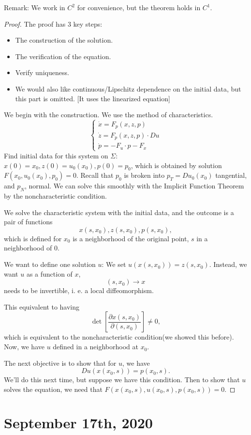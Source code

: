 \documentclass[11pt]{scrartcl}
\begin{document}
Remark: We work in $C^2$ for convenience, but the theorem holds in $C^1$.
\begin{proof}
The proof has 3 key steps:
\begin{itemize}
\item The construction of the solution.
\item The verification of the equation.
\item Verify uniqueness.
\item We would also like continuous/Lipschitz dependence on the initial data, but this part is omitted.  [It uses the linearized equation]
\end{itemize}
We begin with the construction.  We use the method of characteristics.  
$$\begin{cases}
\dot{x} = F_p(x, z, p)\\
\dot z = F_p(x, z, p) \cdot Du\\
\dot p = - F_u \cdot p - F_x
\end{cases}
$$
Find initial data for this system on $\Sigma:$ $x(0) = x_0, z(0) = u_0(x_0), p(0) = p_0$, which is obtained by solution $F(x_0, u_0(x_0), p_0) = 0$.  Recall that $p_0$ is broken into $p_T = Du_0(x_0)$ tangential, and $p_N$, normal.  We can solve this smoothly with the Implicit Function Theorem by the noncharacteristic condition.  

We solve the characteristic system with the initial data, and the outcome is a pair of functions 
$$x(s, x_0), z(s, x_0), p(s, x_0),$$
which is defined for $x_0$ is a neighborhood of the original point, $s$ in a neighborhood of $0$.

We want to define one solution $u$: We set $u(x(s, x_0)) = z(s, x_0)$.  Instead, we want $u$ as a function of $x$,
$$(s, x_0) \rightarrow x$$ needs to be invertible, i. e. a local diffeomorphism.

This equivalent to having 
$$\det \left [\frac{\partial x(s, x_0)}{\partial (s, x_0)}\right ] \ne 0,$$
which is equivalent to the noncharacteristic condition(we showed this before).  Now, we have $u$ defined in a neighborhood at $x_0$.

The next objective is to show that for $u$, we have
$$\boxed{Du(x(x_0, s)) = p(x_0, s)}.$$
We'll do this next time, but suppose we have this condition.  Then to show that $u$ solves the equation, we need that $F(x(x_0, s), u(x_0, s), p(x_0, s)) = 0$.
\end{proof}
\pagebreak
\section{September 17th, 2020}
\end{document}

